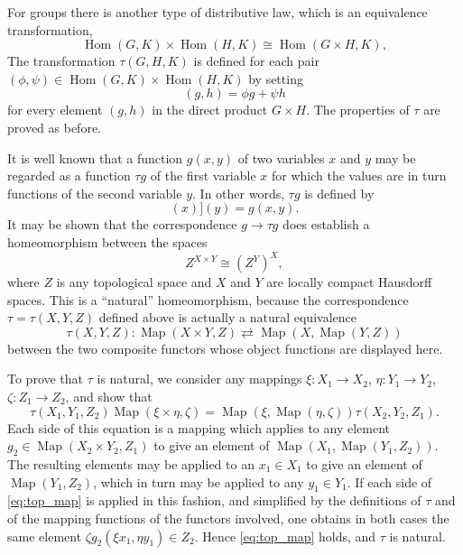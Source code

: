 \documentclass[11pt,a4paper]{report}
\DeclareMathOperator{\map}{Map}
\DeclareMathOperator{\hm}{Hom}
\begin{document}
For groups there is another type of distributive law, which is an equivalence transformation,
\begin{equation*}
	\hm(G,K)\times\hm(H,K)\cong\hm(G\times H, K),
\end{equation*}
The transformation $\tau(G,H,K)$ is defined for each pair $(\phi,\psi)\in\hm(G,K)\times\hm(H,K)$ by setting
\begin{equation*}
	[\tau(G,H,K)(\phi,\psi)](g,h)= \phi g + \psi h
\end{equation*}
for every element $(g,h)$ in the direct product $G\times H$. The properties of $\tau$ are proved as before.

It is well known that a function $g(x,y)$ of two variables $x$ and $y$ may be regarded as a function $\tau g$
of the first variable $x$ for which the values are in turn functions of the second variable $y$. In other
words, $\tau g$ is defined by
\begin{equation*}
	[[\tau g](x)](y)= g(x,y).
\end{equation*}
It may be shown that the correspondence $g\rightarrow\tau g$ does establish a homeomorphism between the spaces
\begin{equation*}
	Z^{X\times Y}\cong {(Z^Y)}^X,
\end{equation*}
where $Z$ is any topological space and $X$ and $Y$ are locally compact Hausdorff spaces. This is a ``natural''
homeomorphism, because the correspondence $\tau=\tau(X,Y,Z)$ defined above is actually a natural equivalence
\begin{equation*}
	\tau(X,Y,Z):\map(X\times Y, Z)\rightleftarrows\map(X,\map(Y,Z))
\end{equation*}
between the two composite functors whose object functions are displayed here.

To prove that $\tau$ is natural, we consider any mappings $\xi:X_1\rightarrow X_2$, $\eta:Y_1\rightarrow Y_2$,
$\zeta:Z_1\rightarrow Z_2$, and show that
\begin{equation}\label{eq:top_map}
	\tau(X_1,Y_1,Z_2)\map(\xi\times\eta,\zeta)=\map(\xi,\map(\eta,\zeta))\tau(X_2,Y_2,Z_1).
\end{equation}
Each side of this equation is a mapping which applies to any element $g_2\in\map(X_2\times Y_2,Z_1)$ to give
an element of $\map(X_1,\map(Y_1,Z_2))$. The resulting elements may be applied to an $x_1\in X_1$ to give an
element of $\map(Y_1,Z_2)$, which in turn may be applied to any $y_1\in Y_1$. If each side of \cref{eq:top_map}
is applied in this fashion, and simplified by the definitions of $\tau$ and of the mapping functions of the
functors involved, one obtains in both cases the same element $\zeta g_2(\xi x_1,\eta y_1)\in Z_2$.
Hence \cref{eq:top_map} holds, and $\tau$ is natural.
\end{document}
